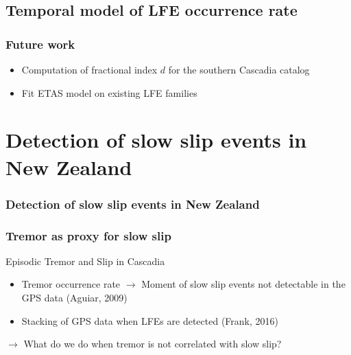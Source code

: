 \documentclass{beamer}
\begin{document}

	\subsection{Temporal model of LFE occurrence rate}

	\begin{frame}
		\frametitle{Future work}
		\begin{itemize}
			\item Computation of fractional index $d$ for the southern Cascadia catalog
			\item Fit ETAS model on existing LFE families
		\end{itemize}
	\end{frame}
		

	\section{Detection of slow slip events in New Zealand}

	\begin{frame}
		\frametitle{Detection of slow slip events in New Zealand}
	\end{frame}

	\begin{frame}
		\frametitle{Tremor as proxy for slow slip}
		Episodic Tremor and Slip in Cascadia
		\begin{itemize}
			\item Tremor occurrence rate $\rightarrow$ Moment of slow slip events not detectable in the GPS data (Aguiar, 2009)
			\item Stacking of GPS data when LFEs are detected (Frank, 2016)
		\end{itemize}
		$\rightarrow$ What do we do when tremor is not correlated with slow slip?
	\end{frame}
		
\end{document}
